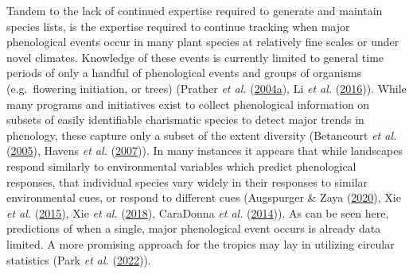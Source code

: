 \documentclass[
]{article}
\begin{document}
Tandem to the lack of continued expertise required to generate and
maintain species lists, is the expertise required to continue tracking
when major phenological events occur in many plant species at relatively
fine scales or under novel climates. Knowledge of these events is
currently limited to general time periods of only a handful of
phenological events and groups of organisms (e.g.~flowering initiation,
or trees) (Prather \emph{et al.}
(\protect\hyperlink{ref-prather2004implications}{2004a}), Li \emph{et
al.} (\protect\hyperlink{ref-li2016responses}{2016})). While many
programs and initiatives exist to collect phenological information on
subsets of easily identifiable charismatic species to detect major
trends in phenology, these capture only a subset of the extent diversity
(Betancourt \emph{et al.}
(\protect\hyperlink{ref-betancourt2005implementing}{2005}), Havens
\emph{et al.} (\protect\hyperlink{ref-havens2007chicago}{2007})). In
many instances it appears that while landscapes respond similarly to
environmental variables which predict phenological responses, that
individual species vary widely in their responses to similar
environmental cues, or respond to different cues (Augspurger \& Zaya
(\protect\hyperlink{ref-augspurger2020concordance}{2020}), Xie \emph{et
al.} (\protect\hyperlink{ref-xie2015deciduous}{2015}), Xie \emph{et al.}
(\protect\hyperlink{ref-xie2018predicting}{2018}), CaraDonna \emph{et
al.} (\protect\hyperlink{ref-caradonna2014shifts}{2014})). As can be
seen here, predictions of when a single, major phenological event occurs
is already data limited. A more promising approach for the tropics may
lay in utilizing circular statistics (Park \emph{et al.}
(\protect\hyperlink{ref-park2022herbarium}{2022})).
\end{document}

